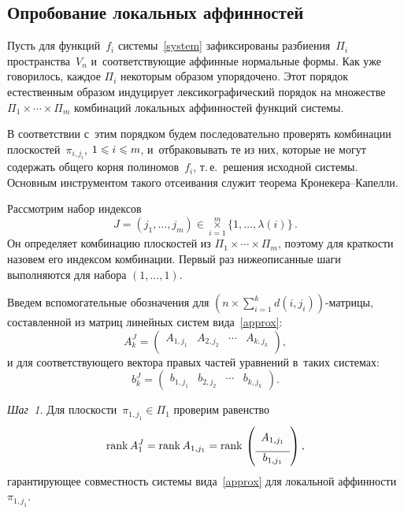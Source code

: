 \begin{multicols}{2}
\subsection{Опробование локальных аффинностей}

Пусть для функций~$f_i$ системы~\eqref{system} зафиксированы разбиения~$\Pi_i$ 
пространства~$V_n$ и~соответствующие аффинные нормальные формы.
Как уже говорилось, каждое $\Pi_i$ некоторым образом упорядочено. Этот порядок 
естественным образом индуцирует лексикографический порядок на множестве 
$\Pi_1\times\cdots\times\Pi_m$ комбинаций локальных аффинностей функций системы.

В соответствии с~этим порядком будем последовательно проверять комбинации 
плоскостей~$\pi_{i,j_i}$, $1\hm\leqslant i\hm\leqslant m$, и~отбраковывать те из них, которые не 
могут содержать общего корня полиномов~$f_i$, т.\,е.\ решения исходной системы. 
Основным инструментом такого отсеивания служит теорема Кро\-не\-ке\-ра--Ка\-пелли.

Рассмотрим набор индексов 
$$
J=(j_1,\ldots,j_m)\in\mathop{\times}\limits_{i=1}^m 
\{1,\ldots,\lambda(i)\}\,. 
$$
Он определяет комбинацию плоскостей из\linebreak 
$\Pi_1\times\cdots\times\Pi_m$, поэтому для краткости назовем его индексом 
комбинации. Первый раз нижеописанные шаги выполняются для набора $(1,\ldots,1)$.

Введем вспомогательные обозначения для $\left(n\times\sum\nolimits_{i=1}^k 
d(i,j_i)\right)$-мат\-ри\-цы, составленной из мат\-риц линейных систем 
вида~\eqref{approx}:
$$
A^{J}_k = \left(\begin{array}{c|c|c|c}
                A_{1,j_1} & A_{2,j_2} & \cdots & A_{k,j_k}\\
              \end{array}\right),
              $$
и для соответствующего вектора правых частей уравнений в~таких системах:
$$
b^{J}_k = \left(\begin{array}{c|c|c|c}
                b_{1,j_1} & b_{2,j_2} & \cdots & b_{k,j_k}
              \end{array}\right).
              $$


\textit{Шаг~1.} Для плоскости~$\pi_{1,j_1}\in\Pi_1$ проверим равенство
$$
\rank A^{J}_1 = \rank A_{1,j_1} = \rank
    \left(\begin{array}{c}
            \rule{0pt}{1.2em} A_{1,j_1} \\[6pt]
            \hline
            b_{1,j_1}
          \end{array}\right),
$$
гарантирующее совместность системы вида~\eqref{approx} для локальной 
аффинности~$\pi_{1,j_1}$.


\end{multicols}
